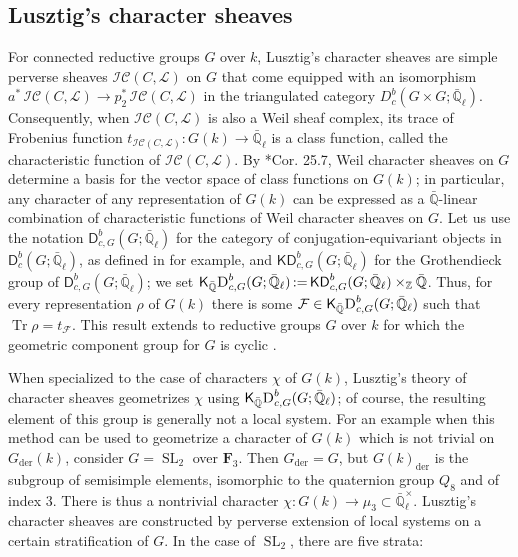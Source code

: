 \documentclass[10pt]{amsart}
\theoremstyle{plain}
\theoremstyle{definition}
\newcommand{\FFF}{{\mathbf{F}_3}}
\newcommand{\ZZ}{{\mathbb{Z}}}
\newcommand{\QQ}{{\mathbb{Q}}}
\newcommand{\EE}{\mathbb{\bar Q}_\ell}
\newcommand{\EEx}{\EE^\times}
\DeclareMathOperator{\trace}{Tr}
\DeclareMathOperator{\SL}{SL}
\newcommand{\der}{_{\operatorname{der}}}
\newcommand{\ceq}{{\, :=\, }}
\newcommand{\trFrob}[1]{t_{#1}}
\newcommand{\cs}[1]{{\mathcal{#1}}}
\newcommand{\IC}{\mathcal{IC}}
\begin{document}
\subsection{Lusztig's character sheaves}\label{ssec:LCS}

For connected reductive groups $G$ over $k$, Lusztig's character sheaves are simple perverse sheaves $\IC(C,\mathcal{L})$ on $G$ that come equipped with an isomorphism $a^*\, \IC(C,\mathcal{L}) \to p_2^*\, \IC(C,\mathcal{L})$ in the triangulated category $D^b_c(G\times G;\EE)$.
Consequently, when $\IC(C,\mathcal{L})$ is also a Weil sheaf complex, its trace of Frobenius function $\trFrob{\IC(C,\cs{L})} : G(k)\to \EE$ is a class function, called the characteristic function of $\IC(C,\cs{L})$.
By \cite{lusztig:86a}*{Cor. 25.7}, Weil character sheaves on $G$ determine a basis for the vector space of class functions on $G(k)$; in particular, any character of any representation of $G(k)$ can be expressed as a ${\bar \QQ}$-linear combination of characteristic functions of Weil character sheaves on $G$.
Let us use the notation $\mathsf{D}^b_{c,G}(G;\EE)$ for the category of conjugation-equivariant objects in $\mathsf{D}^b_{c}(G;\EE)$, as defined in \cite{bernstein-lunts:equivariant} for example, and $\mathsf{KD}^b_{c,G}(G;\EE)$ for the Grothendieck group of $\mathsf{D}^b_{c,G}(G;\EE)$; we set $\mathsf{K}_{\bar\QQ}\textsc{D}^b_{c,G}(G;\EE)\ceq \mathsf{KD}^b_{c,G}(G;\EE)\times_{\ZZ} {\bar\QQ}$.
Thus, for every representation $\rho$ of $G(k)$ there is some $\cs{F}\in \mathsf{K}_{\bar\QQ}\textsc{D}^b_{c,G}(G;\EE)$ such that $\trace\rho = \trFrob{\cs{F}}$.
This result extends to reductive groups $G$ over $k$ for which the geometric component group for $G$ is cyclic \cite{lusztig:disconnected1}.

When specialized to the case of characters $\chi$ of $G(k)$, Lusztig's theory of character sheaves geometrizes $\chi$ using $\mathsf{K}_{\bar\QQ}\textsc{D}^b_{c,G}(G;\EE)$; of course, the resulting element of this group is generally not a local system.
%
For an example when this method can be used to geometrize a character of $G(k)$ which is not trivial on $G\der(k)$, consider $G = \SL_2$ over $\FFF$.
Then $G\der = G$, but $G(k)\der$ is the subgroup of semisimple elements,
isomorphic to the quaternion group $Q_8$ and of index $3$.
There is thus a nontrivial character $\chi : G(k) \to \mu_3 \subset \EEx$.  
Lusztig's character sheaves are constructed by perverse extension of local systems on a certain stratification of $G$.
In the case of $\SL_2$, there are five strata:
\vspace{0.1in}
\end{document}
